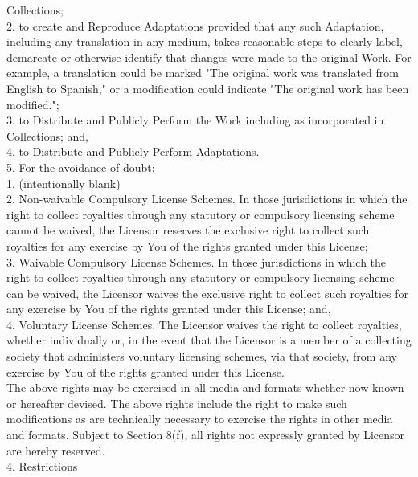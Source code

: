 {   Collections;
\\[4pt]
   2. to create and Reproduce Adaptations provided that any such
   Adaptation, including any translation in any medium, takes
   reasonable steps to clearly label, demarcate or otherwise identify
   that changes were made to the original Work. For example, a
   translation could be marked "The original work was translated from
   English to Spanish," or a modification could indicate "The original
   work has been modified.";
\\[4pt]
   3. to Distribute and Publicly Perform the Work including as
   incorporated in Collections; and,
\\[4pt]
   4. to Distribute and Publicly Perform Adaptations.
\\[4pt]
   5. For the avoidance of doubt:
\\[4pt]
         1. (intentionally blank)
\\[4pt]
         2. Non-waivable Compulsory License Schemes. In those
         jurisdictions in which the right to collect royalties through
         any statutory or compulsory licensing scheme cannot be
         waived, the Licensor reserves the exclusive right to collect
         such royalties for any exercise by You of the rights granted
         under this License;
\\[4pt]
         3. Waivable Compulsory License Schemes. In those
         jurisdictions in which the right to collect royalties through
         any statutory or compulsory licensing scheme can be waived,
         the Licensor waives the exclusive right to collect such
         royalties for any exercise by You of the rights granted under
         this License; and,
\\[4pt]
         4. Voluntary License Schemes. The Licensor waives the right
         to collect royalties, whether individually or, in the event
         that the Licensor is a member of a collecting society that
         administers voluntary licensing schemes, via that society,
         from any exercise by You of the rights granted under this
         License.
\\[4pt]
The above rights may be exercised in all media and formats whether now
known or hereafter devised. The above rights include the right to make
such modifications as are technically necessary to exercise the rights
in other media and formats. Subject to Section 8(f), all rights not
expressly granted by Licensor are hereby reserved.
\\[4pt]
4. Restrictions
\\[4pt]
}
